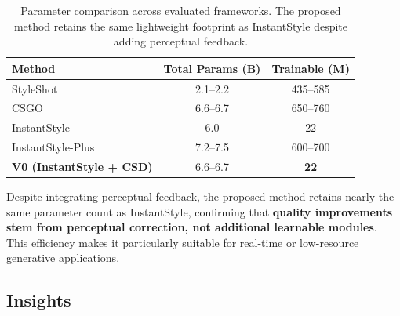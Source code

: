 \begin{table}[!h]
\centering
\caption{Parameter comparison across evaluated frameworks. The proposed method retains the same lightweight footprint as InstantStyle despite adding perceptual feedback.}
\label{tab:phase1_params}
\renewcommand{\arraystretch}{1.3}
\begin{tabular}{lcc}
\toprule
\textbf{Method} & \textbf{Total Params (B)} & \textbf{Trainable (M)} \\
\midrule
StyleShot~\cite{gao2024styleshot}                   & 2.1--2.2 & 435--585 \\
CSGO~\cite{xing2024csgocomp}                        & 6.6--6.7 & 650--760 \\
InstantStyle~\cite{wang2024instantstyle}            & 6.0 & 22 \\
InstantStyle-Plus~\cite{wang2024instantstyleplus}   & 7.2--7.5 & 600--700 \\
\textbf{V0 (InstantStyle + CSD)}              & 6.6--6.7 & \textbf{22} \\
\bottomrule
\end{tabular}
\end{table}

\noindent Despite integrating perceptual feedback, the proposed method retains nearly the same parameter count as InstantStyle, confirming that \textbf{quality improvements stem from perceptual correction, not additional learnable modules}.
This efficiency makes it particularly suitable for real-time or low-resource generative applications.

\subsection{Insights}
\label{sec:discussion_overall}

